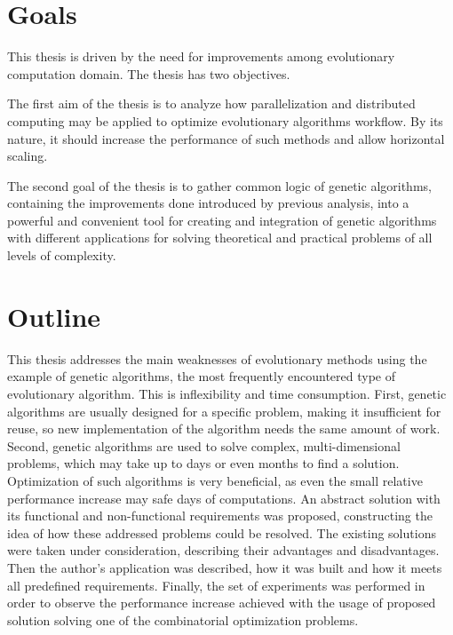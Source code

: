 \section{Goals}

This thesis is driven by the need for improvements among evolutionary computation domain. The thesis has two objectives.

The first aim of the thesis is to analyze how parallelization and distributed computing may be applied to optimize evolutionary algorithms workflow. By its nature, it should increase the performance of such methods and allow horizontal scaling.

The second goal of the thesis is to gather common logic of genetic algorithms, containing the improvements done introduced by previous analysis, into a powerful and convenient tool for creating and integration of genetic algorithms with different applications for solving theoretical and practical problems of all levels of complexity.

\section{Outline}

This thesis addresses the main weaknesses of evolutionary methods using the example of genetic algorithms, the most frequently encountered type of evolutionary algorithm. This is inflexibility and time consumption. First, genetic algorithms are usually designed for a specific problem, making it insufficient for reuse, so new implementation of the algorithm needs the same amount of work. Second, genetic algorithms are used to solve complex, multi-dimensional problems, which may take up to days or even months to find a solution. Optimization of such algorithms is very beneficial, as even the small relative performance increase may safe days of computations. An abstract solution with its functional and non-functional requirements was proposed, constructing the idea of how these addressed problems could be resolved. The existing solutions were taken under consideration, describing their advantages and disadvantages. Then the author's application was described, how it was built and how it meets all predefined requirements. Finally, the set of experiments was performed in order to observe the performance increase achieved with the usage of proposed solution solving one of the combinatorial optimization problems.
